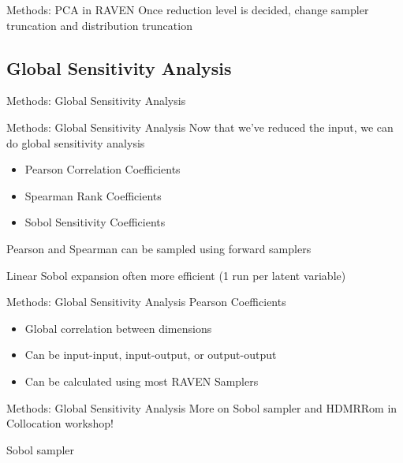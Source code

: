 \documentclass[t,9pt,svgnames]{beamer}
\begin{document}
\begin{frame}[fragile]{Methods: PCA in RAVEN}
  \vfill
  Once reduction level is decided, change sampler truncation and distribution truncation
  
  \vfill
\end{frame}


\subsection{Global Sensitivity Analysis}
\begin{frame}{Methods: Global Sensitivity Analysis}
\end{frame}

\begin{frame}{Methods: Global Sensitivity Analysis}
  \vfill
  Now that we've reduced the input, we can do global sensitivity analysis
  \vfill
  \begin{itemize}
    \item Pearson Correlation Coefficients
  \vfill
    \item Spearman Rank Coefficients
  \vfill
    \item Sobol Sensitivity Coefficients
  \end{itemize}
  \vfill
  Pearson and Spearman can be sampled using forward samplers
  \vfill

  Linear Sobol expansion often more efficient (1 run per latent variable)
  \vfill
\end{frame}

\begin{frame}{Methods: Global Sensitivity Analysis}
  \vfill
  Pearson Coefficients
  \vfill
  \begin{itemize}
    \item Global correlation between dimensions
  \vfill
    \item Can be input-input, input-output, or output-output
  \vfill
    \item Can be calculated using most RAVEN Samplers
  \end{itemize}
  \vfill
\end{frame}

\begin{frame}[fragile]{Methods: Global Sensitivity Analysis}
  \vfill
  More on Sobol sampler and HDMRRom in Collocation workshop!
  \vfill

  Sobol sampler
  
  \vfill
\end{frame}
\end{document}
